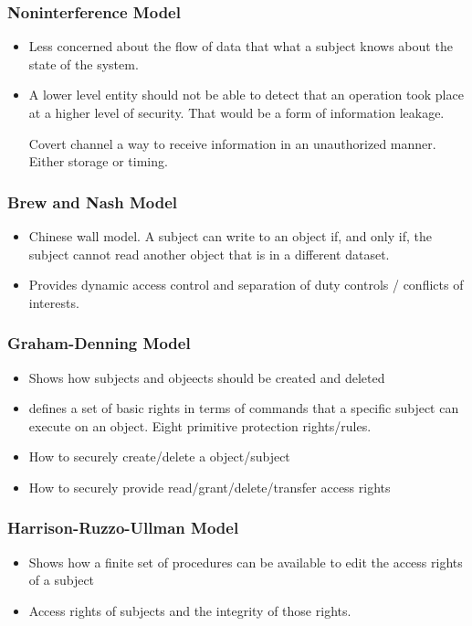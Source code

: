 \documentclass[11pt]{article}
\begin{document}
\subsubsection{Noninterference Model}
\label{sec:org7ca794d}
\begin{itemize}
\item Less concerned about the flow of data that what a subject knows about the state of the system.
\item A lower level entity should not be able to detect that an operation took place at a higher level of security. That would be a form of information leakage.
\item[{Covert channel}] a way to receive information in an unauthorized manner. Either storage or timing.
\end{itemize}
\subsubsection{Brew and Nash Model}
\label{sec:org53bf7fa}
\begin{itemize}
\item Chinese wall model. A subject can write to an object if, and only if, the subject cannot read another object that is in a different dataset.
\item Provides dynamic access control and separation of duty controls / conflicts of interests.
\end{itemize}
\subsubsection{Graham-Denning Model}
\label{sec:org8a5fbf7}
\begin{itemize}
\item Shows how subjects and objeects should be created and deleted
\item defines a set of basic rights in terms of commands that a specific subject can execute on an object. Eight primitive protection rights/rules.
\item How to securely create/delete a object/subject
\item How to securely provide read/grant/delete/transfer access rights
\end{itemize}
\subsubsection{Harrison-Ruzzo-Ullman Model}
\label{sec:org48b5abd}
\begin{itemize}
\item Shows how a finite set of procedures can be available to edit the access rights of a subject
\item Access rights of subjects and the integrity of those rights.
\end{itemize}
\end{document}
